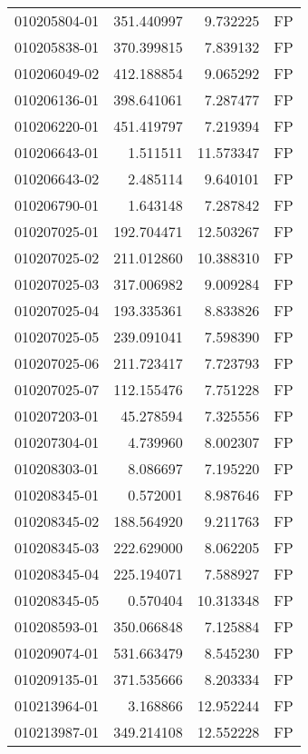 \begin{tabular}{lrrl}
010205804-01 &  351.440997 &       9.732225 &   FP \\
010205838-01 &  370.399815 &       7.839132 &   FP \\
010206049-02 &  412.188854 &       9.065292 &   FP \\
010206136-01 &  398.641061 &       7.287477 &   FP \\
010206220-01 &  451.419797 &       7.219394 &   FP \\
010206643-01 &    1.511511 &      11.573347 &   FP \\
010206643-02 &    2.485114 &       9.640101 &   FP \\
010206790-01 &    1.643148 &       7.287842 &   FP \\
010207025-01 &  192.704471 &      12.503267 &   FP \\
010207025-02 &  211.012860 &      10.388310 &   FP \\
010207025-03 &  317.006982 &       9.009284 &   FP \\
010207025-04 &  193.335361 &       8.833826 &   FP \\
010207025-05 &  239.091041 &       7.598390 &   FP \\
010207025-06 &  211.723417 &       7.723793 &   FP \\
010207025-07 &  112.155476 &       7.751228 &   FP \\
010207203-01 &   45.278594 &       7.325556 &   FP \\
010207304-01 &    4.739960 &       8.002307 &   FP \\
010208303-01 &    8.086697 &       7.195220 &   FP \\
010208345-01 &    0.572001 &       8.987646 &   FP \\
010208345-02 &  188.564920 &       9.211763 &   FP \\
010208345-03 &  222.629000 &       8.062205 &   FP \\
010208345-04 &  225.194071 &       7.588927 &   FP \\
010208345-05 &    0.570404 &      10.313348 &   FP \\
010208593-01 &  350.066848 &       7.125884 &   FP \\
010209074-01 &  531.663479 &       8.545230 &   FP \\
010209135-01 &  371.535666 &       8.203334 &   FP \\
010213964-01 &    3.168866 &      12.952244 &   FP \\
010213987-01 &  349.214108 &      12.552228 &   FP \\

\end{tabular}
